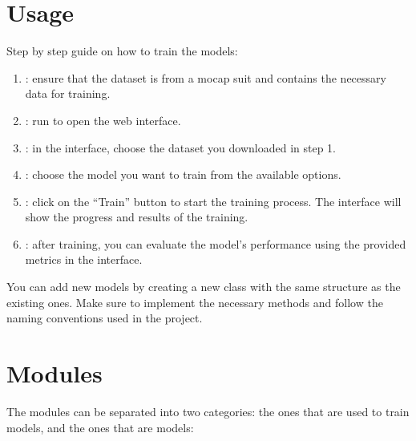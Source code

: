\documentclass[letterpaper,10pt,english]{sphinxmanual}
\begin{document}
\chapter{Usage}
\label{\detokenize{index:usage}}
\sphinxAtStartPar
Step by step guide on how to train the models:
\begin{enumerate}
%
\item {} 
\sphinxAtStartPar
{}: ensure that the dataset is from a mocap suit and contains the necessary data for training.

\item {} 
\sphinxAtStartPar
{}: run  to open the web interface.

\item {} 
\sphinxAtStartPar
{}: in the interface, choose the dataset you downloaded in step 1.

\item {} 
\sphinxAtStartPar
{}: choose the model you want to train from the available options.

\item {} 
\sphinxAtStartPar
{}: click on the “Train” button to start the training process. The interface will show the progress and results of the training.

\item {} 
\sphinxAtStartPar
{}: after training, you can evaluate the model’s performance using the provided metrics in the interface.

\end{enumerate}

\sphinxAtStartPar
You can add new models by creating a new class with the same structure as the existing ones. Make sure to implement the necessary methods and follow the naming conventions used in the project.


\chapter{Modules}
\label{\detokenize{index:modules}}
\sphinxAtStartPar
The modules can be separated into two categories: the ones that are used to train models, and the ones that are models:
\end{document}
